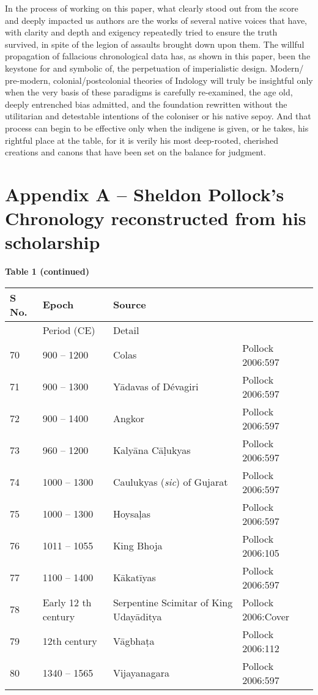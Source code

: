 In the process of working on this paper, what clearly stood out from the score and deeply impacted us authors are the works of several native voices that have, with clarity and depth and exigency repeatedly tried to ensure the truth survived, in spite of the legion of assaults brought down upon them. The willful propagation of fallacious chronological data has, as shown in this paper, been the keystone for and symbolic of, the perpetuation of imperialistic design. Modern/ pre-modern, colonial/postcolonial theories of Indology will truly be insightful only when the very basis of these paradigms is carefully re-examined, the age old, deeply entrenched bias admitted, and the foundation rewritten without the utilitarian and detestable intentions of the coloniser or his native sepoy. And that process can begin to be effective only when the indigene is given, or he takes, his rightful place at the table, for it is verily his most deep-rooted, cherished creations and canons that have been set on the balance for judgment.


\section*{Appendix A -- Sheldon Pollock’s Chronology reconstructed from his scholarship}

\textbf{Table 1 (continued)}

\begin{longtable}{|l|l|l|l|}
\hline
S No. & Epoch & Source \\
\hline
  & Period (CE) & Detail &   \\
\hline
70 & 900 – 1200 & Colas & Pollock 2006:597 \\
\hline
71 & 900 – 1300 & Yādavas of Dévagiri & Pollock 2006:597 \\
\hline
72 & 900 – 1400 & Angkor & Pollock 2006:597 \\
\hline
73 & 960 – 1200 & Kalyāna Cāḷukyas & Pollock 2006:597 \\
\hline
74 & 1000 – 1300 & Caulukyas (\textit{sic}) of Gujarat & Pollock 2006:597 \\
\hline
75 & 1000 – 1300 & Hoysaḷas & Pollock 2006:597 \\
\hline
76 & 1011 – 1055 & King Bhoja & Pollock 2006:105 \\
\hline
77 & 1100 – 1400 & Kākatīyas & Pollock 2006:597 \\
\hline
78 & Early 12 th   century & Serpentine Scimitar of King Udayāditya & Pollock 2006:Cover \\
\hline
79 & 12th century & Vāgbhaṭa & Pollock 2006:112 \\
\hline
80 & 1340 – 1565 & Vijayanagara & Pollock 2006:597 \\
\hline
\end{longtable}

